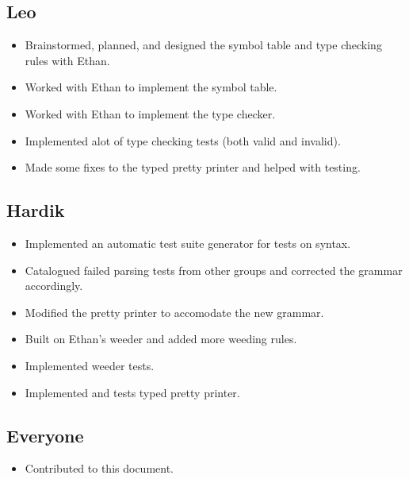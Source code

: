 \documentclass{article}
\begin{document}
\subsection*{Leo}

\begin{itemize}
    \item Brainstormed, planned, and designed the symbol table and type checking rules with Ethan.
    \item Worked with Ethan to implement the symbol table.
    \item Worked with Ethan to implement the type checker.
    \item Implemented alot of type checking tests (both valid and invalid).
    \item Made some fixes to the typed pretty printer and helped with testing.
\end{itemize}

\subsection*{Hardik}

\begin{itemize}
    \item Implemented an automatic test suite generator for tests on syntax.
    \item Catalogued failed parsing tests from other groups and corrected the grammar accordingly.
    \item Modified the pretty printer to accomodate the new grammar.
    \item Built on Ethan's weeder and added more weeding rules.
    \item Implemented weeder tests.
    \item Implemented and tests typed pretty printer.
\end{itemize}

\subsection*{Everyone}

\begin{itemize}
    \item Contributed to this document.
\end{itemize}
\end{document}
